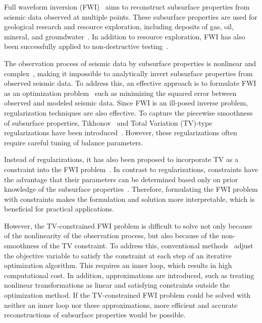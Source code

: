 Full waveform inversion (FWI)~\cite{FWI0,FWI1} aims to reconstruct subsurface properties from seismic data observed at multiple points.
These subsurface properties are used for geological research and resource exploration, including deposits of gas, oil, mineral, and groundwater~\cite{FWI1,FWIApplicationGroundwater0,FWIApplicationGroundwater1}.
In addition to resource exploration, FWI has also been successfully applied to non-destructive testing~\cite{FWIApplicationNonDestructiveTesting0,FWIApplicationNonDestructiveTesting1}.

The observation process of seismic data by subsurface properties is nonlinear and complex~\cite{FWI1}, making it impossible to analytically invert subsurface properties from observed seismic data.
To address this, an effective approach is to formulate FWI as an optimization problem~\cite{FWI0,CustomFWI0,CustomFWI1,CustomFWI2,CustomFWI3,CustomFWI4,CustomFWI5} such as minimizing the squared error between observed and modeled seismic data.
Since FWI is an ill-posed inverse problem, regularization techniques are also effective.
To capture the piecewise smoothness of subsurface properties, Tikhonov~\cite{tikhonov} and Total Variation (TV)-type~\cite{TV,TGV} regularizations have been introduced~\cite{FWI-with-tikhonov-regularization,FWI-with-TV-regularization,FWI-with-directional-TV-regularization,FWI-with-high-order-TV-regularization,FWI-with-TGV-regularization}.
However, these regularizations often require careful tuning of balance parameters.

Instead of regularizations, it has also been proposed to incorporate TV as a constraint into the FWI problem~\cite{FWI-with-TV-constraint,FWI-with-TV-constraint2,FWI-with-TV-constraint3}.
In contrast to regularizations, constraints have the advantage that their parameters can be determined based only on prior knowledge of the subsurface properties~\cite{constraints-vs-penalties-in-FWI}.
Therefore, formulating the FWI problem with constraints makes the formulation and solution more interpretable, which is beneficial for practical applications.

However, the TV-constrained FWI problem is difficult to solve not only because of the nonlinearity of the observation process, but also because of the non-smoothness of the TV constraint.
To address this, conventional methods~\cite{FWI-with-TV-constraint,FWI-with-TV-constraint2,FWI-with-TV-constraint3} adjust the objective variable to satisfy the constraint at each step of an iterative optimization algorithm.
This requires an inner loop, which results in high computational cost.
In addition, approximations are introduced, such as treating nonlinear transformations as linear and satisfying constraints outside the optimization method.
If the TV-constrained FWI problem could be solved with neither an inner loop nor these approximations, more efficient and accurate reconstructions of subsurface properties would be possible.

